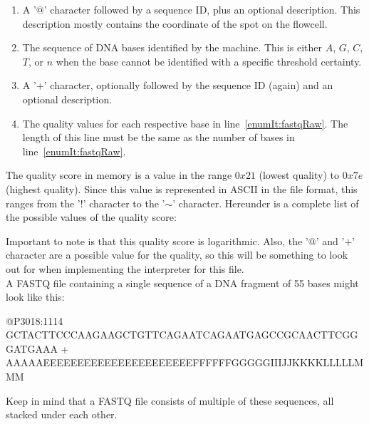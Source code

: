 \begin{enumerate}
	\item A '$@$' character followed by a sequence ID, plus an optional description. This description mostly contains the coordinate of the spot on the flowcell.
	\item \label{enumIt:fastqRaw} The sequence of DNA bases identified by the machine. This is either $A$, $G$, $C$, $T$, or $n$ when the base cannot be identified with a specific threshold certainty.
	\item A '$+$' character, optionally followed by the sequence ID (again) and an optional description.
	\item The quality values for each respective base in line~\ref{enumIt:fastqRaw}. The length of this line must be the same as the number of bases in line~\ref{enumIt:fastqRaw}.
\end{enumerate}

The quality score in memory is a value in the range $0x21$ (lowest quality) to $0x7e$ (highest quality). Since this value is represented in ASCII in the file format, this ranges from the '$!$' character to the '$\mathtt{\sim}$' character. Hereunder is a complete list of the possible values of the quality score:

\begin{lcverbatim}
!"#$%
[\]^_`abcdefghijklmnopqrstuvwxyz{|}~
\end{lcverbatim}


Important to note is that this quality score is logarithmic. Also, the '$@$' and '$+$' character are a possible value for the quality, so this will be something to look out for when implementing the interpreter for this file.\\

	
A FASTQ file containing a single sequence of a DNA fragment of 55 bases might look like this:


\begin{lcverbatim}
@P3018:1114
GCTACTTCCCAAGAAGCTGTTCAGAATCAGAATGAGCCGCAACTTCGGGATGAAA
+
AAAAAEEEEEEEEEEEEEEEEEEEEEEFFFFFFGGGGGIIIJJKKKKLLLLLMMM
\end{lcverbatim}

Keep in mind that a FASTQ file consists of multiple of these sequences, all stacked under each other.
	
	

